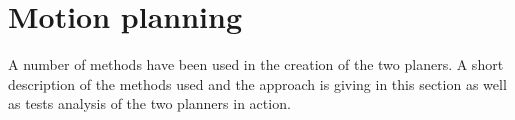 \documentclass[../Head/Main.tex]{subfiles}
\begin{document}
\section{Motion planning}

A number of methods have been used in the creation of the two planers. A short description of the methods used and the approach is giving in this section as well as tests analysis of the two planners in action. 



\end{document}
